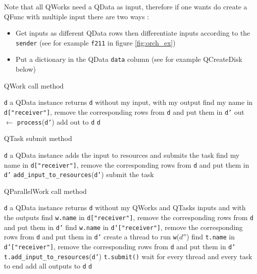 \documentclass[10pt, conference, compsocconf]{IEEEtran}
\begin{document}
Note that all QWorks need a QData as input, therefore if one wants do create a QFunc with multiple input there are two ways :
\begin{itemize}
\item Get inputs as different QData rows then differentiate inputs according to the \texttt{sender} (see for example \texttt{f211} in figure \ref{fig:orch_ex})
\item Put a dictionary in the QData \texttt{data} column (see for example QCreateDisk below)
\end{itemize}

\begin{algorithm}[H]
\caption{QWork call method}
\label{alg:Qwork}
\begin{algorithmic}
\REQUIRE \texttt{d} a QData instance
\ENSURE returns \texttt{d} without my input, with my output
\STATE find my name in \texttt{d["receiver"]}, remove the corresponding rows from \texttt{d} and put them in \texttt{d'}
\STATE out $\leftarrow$ \texttt{process}(\texttt{d'})
\STATE add out to \texttt{d}
\RETURN \texttt{d}
\end{algorithmic}
\end{algorithm}

\begin{algorithm}[H]
\caption{QTask submit method}
\label{alg:Qtask}
\begin{algorithmic}
\REQUIRE \texttt{d} a QData instance
\ENSURE adds the input to resources and submits the task
\STATE find my name in \texttt{d["receiver"]}, remove the corresponding rows from \texttt{d} and put them in \texttt{d'}
\STATE \texttt{add\_input\_to\_resources}(\texttt{d'})
\STATE submit the task
\end{algorithmic}
\end{algorithm}

\begin{algorithm}
\caption{QParallelWork call method}
\label{alg:Qparallel}
\begin{algorithmic}
\REQUIRE \texttt{d} a QData instance
\ENSURE returns \texttt{d} without my QWorks and QTasks inputs and with the outputs
\STATE find \texttt{w.name} in \texttt{d["receiver"]}, remove the corresponding rows from \texttt{d} and put them in \texttt{d'}
\ENDFOR
{}
\STATE find \texttt{w.name} in \texttt{d'["receiver"]}, remove the corresponding rows from \texttt{d} and put them in \texttt{d'}
\STATE create a thread to run \texttt{w}($d''$)
\ENDFOR
{}
\STATE find \texttt{t.name} in \texttt{d'["receiver"]}, remove the corresponding rows from \texttt{d} and put them in \texttt{d'}
\STATE \texttt{t.add\_input\_to\_resources}(\texttt{d'})
\STATE \texttt{t.submit()}
\ENDFOR
\STATE wait for every thread and every task to end
\STATE add all outputs to \texttt{d}
\RETURN \texttt{d}
\end{algorithmic}
\end{algorithm}
\end{document}
